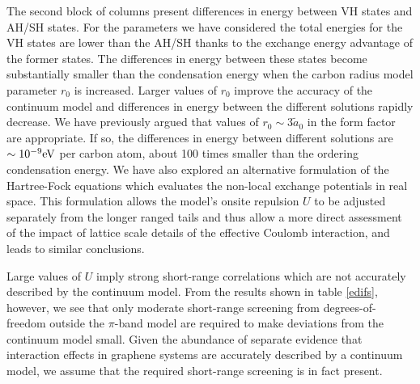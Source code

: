 \documentclass[twocolumn,prb,showpacs,preprintnumbers,amsmath,amssymb]{revtex4}
\begin{document}
The second block of columns present differences in energy between VH states and AH/SH states.
For the parameters we have considered the total energies 
for the VH states are lower than the AH/SH thanks to the exchange energy advantage of the former
states.
The differences in energy between these 
states become substantially smaller than the condensation energy
when the carbon radius model parameter $r_0$ is increased.  Larger values of $r_0$ improve the 
accuracy of the continuum model and differences in energy between the different solutions 
rapidly decrease.  We have previously argued that values of $r_0 \sim 3 \widetilde{a}_0$
in the form factor are appropriate.  If so, the differences in energy 
between different solutions are $\sim  10^{-9} {\rm eV}$ per carbon atom,
about 100 times smaller than the ordering condensation energy.
We have also explored an alternative formulation of the 
Hartree-Fock equations which evaluates the non-local exchange potentials in real space. 
This formulation allows the model's onsite repulsion $U$ to be adjusted separately 
from the longer ranged tails\cite{bfieldinsulator,latticescale} and thus
allow a more direct assessment of the impact of lattice scale details of the effective Coulomb interaction,
and leads to similar conclusions.  

Large values of $U$ imply strong short-range correlations which are not accurately described by the 
continuum model.
From the results shown in table \ref{edifs}, however,
we see that only moderate short-range screening from degrees-of-freedom 
outside the $\pi$-band model are required to make deviations from the 
continuum model small.  Given the abundance of separate evidence that 
interaction effects in graphene systems are accurately described by a 
continuum model, we assume that the required short-range screening is in fact present.   
\end{document}
